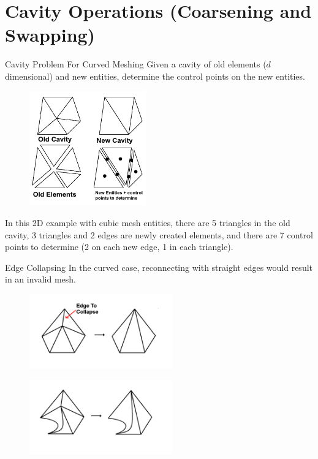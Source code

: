 \documentclass[12pt]{beamer}
\begin{document}
\section{Cavity Operations (Coarsening and Swapping)}
\begin{frame}{Cavity Problem For Curved Meshing}
Given a cavity of old elements ($d$ dimensional) and new entities, determine the control points on the new entities.
\begin{figure}
  \centering
  \includegraphics[width=0.45\textwidth]{bezier_images/cavity2.png} 
\end{figure}
In this 2D example with cubic mesh entities, there are 5 triangles in the old cavity, 3 triangles and 2 edges are newly created elements, and there are 7 control points to determine (2 on each new edge, 1 in each triangle).
\end{frame}

\begin{frame}{Edge Collapsing}
In the curved case, reconnecting with straight edges would result in an invalid mesh.
\begin{figure}
  \centering
  \includegraphics[width=0.55\textwidth]{bezier_images/collapse1.png} 
\end{figure}
\begin{figure}
  \centering
  \includegraphics[width=0.55\textwidth]{bezier_images/collapse2.png} 
\end{figure}
\end{frame}
\end{document}
